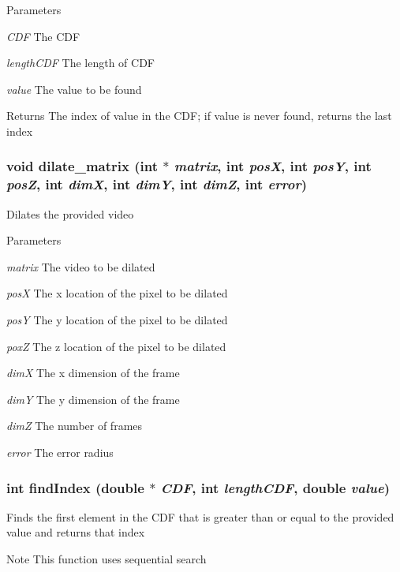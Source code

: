 \begin{DoxyParams}{Parameters}
\item[{\em CDF}]The CDF \item[{\em lengthCDF}]The length of CDF \item[{\em value}]The value to be found \end{DoxyParams}
\begin{DoxyReturn}{Returns}
The index of value in the CDF; if value is never found, returns the last index 
\end{DoxyReturn}
\hypertarget{ex__particle__CUDA__naive_8cu_af2a0216d5b584632a6508d5ad918734e}{
\subsubsection[{dilate\_\-matrix}]{\setlength{\rightskip}{0pt plus 5cm}void dilate\_\-matrix (int $\ast$ {\em matrix}, \/  int {\em posX}, \/  int {\em posY}, \/  int {\em posZ}, \/  int {\em dimX}, \/  int {\em dimY}, \/  int {\em dimZ}, \/  int {\em error})}}
\label{ex__particle__CUDA__naive_8cu_af2a0216d5b584632a6508d5ad918734e}
Dilates the provided video 
\begin{DoxyParams}{Parameters}
\item[{\em matrix}]The video to be dilated \item[{\em posX}]The x location of the pixel to be dilated \item[{\em posY}]The y location of the pixel to be dilated \item[{\em poxZ}]The z location of the pixel to be dilated \item[{\em dimX}]The x dimension of the frame \item[{\em dimY}]The y dimension of the frame \item[{\em dimZ}]The number of frames \item[{\em error}]The error radius \end{DoxyParams}
\hypertarget{ex__particle__CUDA__naive_8cu_a71e946a9752dba5f8f3def41e58a8469}{
\subsubsection[{findIndex}]{\setlength{\rightskip}{0pt plus 5cm}int findIndex (double $\ast$ {\em CDF}, \/  int {\em lengthCDF}, \/  double {\em value})}}
\label{ex__particle__CUDA__naive_8cu_a71e946a9752dba5f8f3def41e58a8469}
Finds the first element in the CDF that is greater than or equal to the provided value and returns that index \begin{DoxyNote}{Note}
This function uses sequential search 
\end{DoxyNote}

